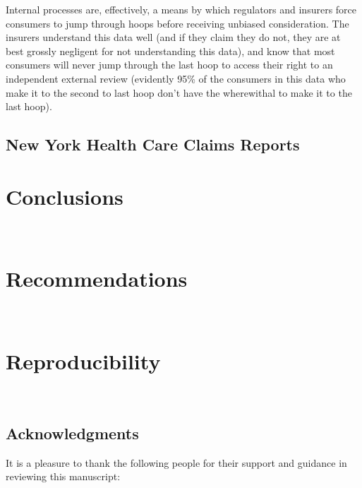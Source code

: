 \documentclass[12pt, a4paper]{report}
\begin{document}
Internal processes are, effectively, a means by which regulators and insurers force consumers to jump through hoops before receiving unbiased consideration. The insurers understand this data well (and if they claim they do not, they are at best grossly negligent for not understanding this data), and know that most consumers will never jump through the last hoop to access their right to an independent external review (evidently 95\% of the consumers in this data who make it to the second to last hoop don't have the wherewithal to make it to the last hoop).\\


\subsection{New York Health Care Claims Reports}

\section{Conclusions}
\hfill\\

\section{Recommendations}
\hfill\\

\section{Reproducibility}
\hfill\\


\subsection{Acknowledgments}
It is a pleasure to thank the following people for their support and guidance in reviewing this manuscript:






	
\end{document}
